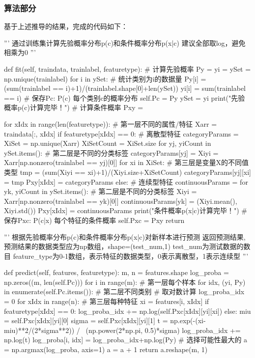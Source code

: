 \documentclass{ctexart}
\begin{document}
\subsubsection{\hei 算法部分}
基于上述推导的结果，完成的代码如下：
\begin{python}
    '''
    通过训练集计算先验概率分布p(c)和条件概率分布p(x|c)
    建议全部取log，避免相乘为0
    '''

    def fit(self, traindata, trainlabel, featuretype):
    # 计算先验概率
    Py = {}
    yi = {}
    ySet = np.unique(trainlabel)
    for i in ySet:
    # 统计类别为i的数据量
    Py[i] = (sum(trainlabel == i)+1)/(trainlabel.shape[0]+len(ySet))
    yi[i] = sum(trainlabel == i)
    # 保存Pc: P(c) 每个类别c的概率分布
    self.Pc = Py
    ySet = yi
    print("先验概率p(c)计算完毕！")
    # 计算条件概率
    Pxy = {}

    for xIdx in range(len(featuretype)):
    # 第一层不同的属性/特征
    Xarr = traindata[:, xIdx]
    if featuretype[xIdx] == 0:
    # 离散型特征
    categoryParams = {}
    XiSet = np.unique(Xarr)
    XiSetCount = XiSet.size
    for yj, yiCount in ySet.items():
    # 第二层是不同的分类标签
    categoryParams[yj] = {}
    Xiyi = Xarr[np.nonzero(trainlabel == yj)[0]]
    for xi in XiSet:
    # 第三层是变量X的不同值类型
    tmp = (sum(Xiyi == xi)+1)/(Xiyi.size+XiSetCount)
    categoryParams[yj][xi] = tmp
    Pxy[xIdx] = categoryParams
    else:
    # 连续型特征
    continuousParams = {}
    for yk, yiCount in ySet.items():
    # 第二层是不同的分类标签
    Xiyi = Xarr[np.nonzero(trainlabel == yk)[0]]
    continuousParams[yk] = (Xiyi.mean(), Xiyi.std())
    Pxy[xIdx] = continuousParams
    print("条件概率p(x|c)计算完毕！")
    # 保存Pxc: P(c|x) 每个特征的条件概率
    self.Pxc = Pxy
    return

    '''
    根据先验概率分布p(c)和条件概率分布p(x|c)对新样本进行预测
    返回预测结果,预测结果的数据类型应为np数组，shape=(test_num,1) test_num为测试数据的数目
    feature_type为0-1数组，表示特征的数据类型，0表示离散型，1表示连续型
    '''

    def predict(self, features, featuretype):
    m, n = features.shape
    log_proba = np.zeros((m, len(self.Pc)))
    for i in range(m):
    # 第一层每个样本
    for idx, (yi, Py) in enumerate(self.Pc.items()):
    # 第二层不同类别
    # 取对数计算
    log_proba_idx = 0
    for xIdx in range(n):
    # 第三层每种特征
    xi = features[i, xIdx]
    if featuretype[xIdx] == 0:
    log_proba_idx += np.log(self.Pxc[xIdx][yi][xi])
    else:
    miu = self.Pxc[xIdx][yi][0]
    sigma = self.Pxc[xIdx][yi][1]
    t = np.exp(-(xi-miu)**2/(2*sigma**2)) / \
    (np.power(2*np.pi, 0.5)*sigma)
    log_proba_idx += np.log(t)
    log_proba[i, idx] = log_proba_idx+np.log(Py)
    # 选择可能性最大的
    a = np.argmax(log_proba, axis=1)
    a = a + 1
    return a.reshape(m, 1)
\end{python}
\end{document}
